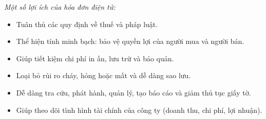 \emph{Một số lợi ích của hóa đơn điện tử:}

\begin{itemize}

\item Tuân thủ các quy định về thuế và pháp luật.

\item Thể hiện tính minh bạch: bảo vệ quyền lợi của người mua và người bán.

\item Giúp tiết kiệm chi phí in ấn, lưu trữ và bảo quản.

\item Loại bỏ rủi ro cháy, hỏng hoặc mất và dễ dàng sao lưu.

\item Dễ dàng tra cứu, phát hành, quản lý, tạo báo cáo và giảm thủ tục giấy tờ.

\item Giúp theo dõi tình hình tài chính của công ty (doanh thu, chi phí, lợi nhuận).

\end{itemize}

